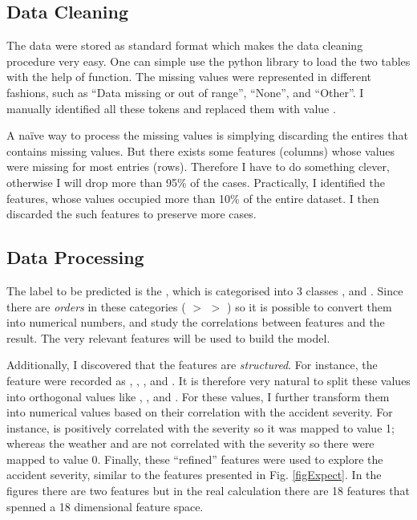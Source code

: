 \documentclass[12pt,a4paper]{article}
\begin{document}
\subsection{Data Cleaning}

The data were stored as standard  format which makes the data cleaning procedure very easy. One can simple use the python library  to load the two tables with the help of  function. The missing values were represented in different fashions, such as ``Data missing or out of range'', ``None'', and ``Other''. I manually identified all these tokens and replaced them with value .

A na\"{i}ve way to process the missing values is simplying discarding the entires that contains missing values. But there exists some features (columns) whose values were missing for most entries (rows). Therefore I have to do something clever, otherwise I will drop more than 95\% of the cases. Practically, I identified the features, whose  values occupied more than 10\% of the entire dataset. I then discarded the such features to preserve more cases.

\subsection{Data Processing}

The label to be predicted is the , which is categorised into 3 classes ,  and . Since there are \emph{orders} in these categories ( $>$  $>$ ) so it is possible to convert them into numerical numbers, and study the correlations between features and the result. The very relevant features will be used to build the model.

Additionally, I discovered that the features are \emph{structured}. For instance, the feature  were recorded as , , , and . It is therefore very natural to split these values into orthogonal values like , , and . For these values, I further transform them into numerical values based on their correlation with the accident severity. For instance,  is positively correlated with the severity so it was mapped to value 1; whereas the weather  and  are not correlated with the severity so there were mapped to value 0. Finally, these ``refined'' features were used to explore the accident severity, similar to the features presented in Fig. \ref{figExpect}. In the figures there are two features but in the real calculation there are 18 features that spenned a 18 dimensional feature space.
\end{document}

